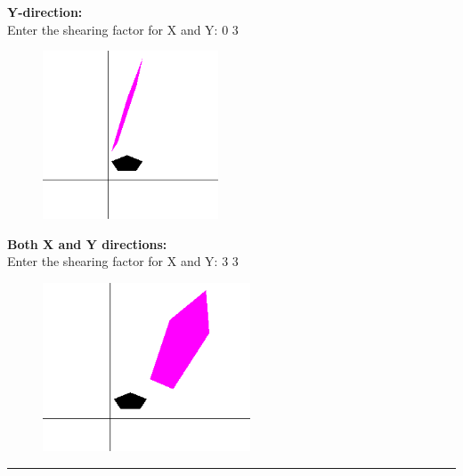 \documentclass[9pt,letterpaper]{article}
\begin{document}
\textbf{Y-direction:}\\

Enter the shearing factor for X and Y: 0 3

\begin{figure}[h]
    \centering
    \includegraphics[height=5cm]{Outputs/OP13.png}
\end{figure}

\newpage
\textbf{Both X and Y directions:}\\

Enter the shearing factor for X and Y: 3 3

\begin{figure}[h]
    \centering
    \includegraphics[height=5cm]{Outputs/OP14.png}
\end{figure}

\bigskip\bigskip
\hrule
\end{document}
